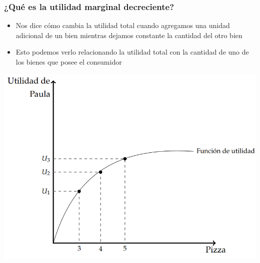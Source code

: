 \documentclass{beamer}
\begin{document}
\begin{frame}
\frametitle{¿Qué es la utilidad marginal decreciente?}
\begin{itemize}
    \item Nos dice cómo cambia la utilidad total cuando agregamos una unidad adicional de un bien mientras dejamos constante la cantidad del otro bien 
    \item Esto podemos verlo relacionando la utilidad total con la cantidad de uno de los bienes que posee el consumidor    
\end{itemize}     
\begin{center}
    \includegraphics[scale=0.3]{../Figures/C7.9b.png}
\end{center}
\end{frame}
\end{document}
